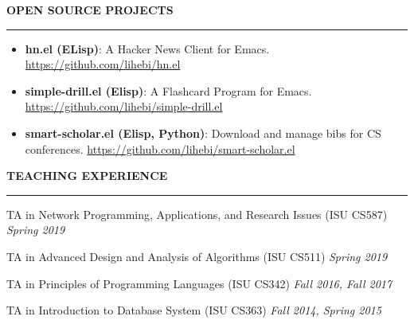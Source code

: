 \documentclass[10pt,letterpaper]{article}
\newenvironment{mysection}[1]{ %
  \medskip
  \MakeUppercase{\bf #1}
  \medskip
  \hrule
  \begin{list}{}{
      \setlength{\leftmargin}{1.5em}
    }
  \item[]
}{
  \end{list}
}
\begin{document}
\begin{mysection}{Open Source Projects}
  \begin{itemize}
  \item \textbf{hn.el (ELisp)}: A Hacker News Client for Emacs.
    \url{https://github.com/lihebi/hn.el}
  \item \textbf{simple-drill.el (Elisp)}: A Flashcard Program for
    Emacs. \url{https://github.com/lihebi/simple-drill.el}
  \item \textbf{smart-scholar.el (Elisp, Python)}: Download and manage
    bibs for CS conferences.
    \url{https://github.com/lihebi/smart-scholar.el}
  \end{itemize}
\end{mysection}

\begin{mysection}{Teaching Experience}
  TA in Network Programming, Applications, and Research Issues (ISU CS587)
  \hfill \emph{Spring 2019}
  
  TA in Advanced Design and Analysis of Algorithms (ISU CS511)
  \hfill \emph{Spring 2019}
  
  TA in Principles of Programming Languages (ISU CS342)
  \hfill \emph{Fall 2016, Fall 2017}

  TA in Introduction to Database System (ISU CS363)
  \hfill \emph{Fall 2014, Spring 2015}
\end{mysection}

\end{document}
